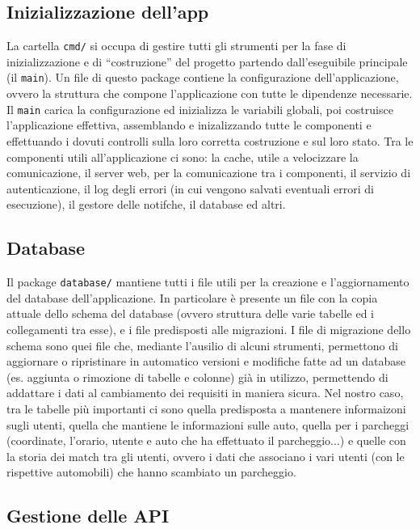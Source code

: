 \documentclass[italian, Lau, oneside, nodefaultfont, noexaminfo]{sapthesis}
\begin{document}
\subsection{Inizializzazione dell'app}
La cartella \texttt{cmd/}  si occupa di gestire tutti gli strumenti per la fase di inizializzazione e di ``costruzione'' del progetto partendo dall'eseguibile principale (il \texttt{main}). 
Un file di questo package contiene la configurazione dell'applicazione, ovvero la struttura che compone l'applicazione con tutte le dipendenze necessarie. 
\\
Il \texttt{main}   carica  la configurazione ed inizializza  le variabili globali, poi  costruisce l'applicazione effettiva, assemblando e inizalizzando tutte le componenti e effettuando i dovuti controlli sulla loro corretta costruzione  e sul loro stato. Tra le componenti utili all'applicazione ci sono: la cache, utile a  velocizzare la comunicazione, il server web, per la comunicazione tra i componenti, il servizio di autenticazione, il log degli errori (in cui vengono salvati eventuali errori di esecuzione), il gestore delle notifche, il database ed altri.


\subsection{Database}
Il package \texttt{database/} mantiene tutti i file utili per la creazione e l'aggiornamento del database dell'applicazione. In particolare \`e presente un file con la copia attuale dello schema del database (ovvero struttura delle varie tabelle ed i collegamenti tra esse), e i file predisposti alle migrazioni. I file di migrazione dello schema sono quei file che, mediante l'ausilio di alcuni strumenti, permettono di aggiornare o ripristinare in automatico versioni e modifiche fatte ad un database (es. aggiunta o rimozione di tabelle e colonne) gi\`a in utilizzo, permettendo di addattare i dati al cambiamento dei requisiti in maniera sicura. Nel nostro caso, tra le tabelle pi\`u importanti ci sono quella predisposta a mantenere informaizoni sugli utenti, quella che mantiene le informazioni sulle auto, quella per i parcheggi (coordinate, l'orario, utente e auto che ha effettuato il parcheggio...) e quelle con la storia dei match tra gli utenti, ovvero i dati che associano i vari utenti (con le rispettive automobili) che hanno scambiato un parcheggio.


\subsection{Gestione delle API}
\end{document}
